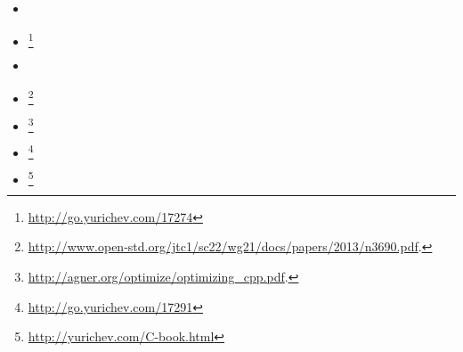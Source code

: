 \label{CCppBooks}

\begin{itemize}

\item \KRBook

\item \CNineNineStd\footnote{\AlsoAvailableAs \url{http://go.yurichev.com/17274}}

\item \TCPPPL

\item \CppOneOneStd\footnote{\AlsoAvailableAs \url{http://www.open-std.org/jtc1/sc22/wg21/docs/papers/2013/n3690.pdf}.}

\item \AgnerFogCPP\footnote{\AlsoAvailableAs \url{http://agner.org/optimize/optimizing_cpp.pdf}.}

\item \ParashiftCPPFAQ\footnote{\AlsoAvailableAs \url{http://go.yurichev.com/17291}}

\item \CNotes\footnote{\AlsoAvailableAs \url{http://yurichev.com/C-book.html}}

\end{itemize}

